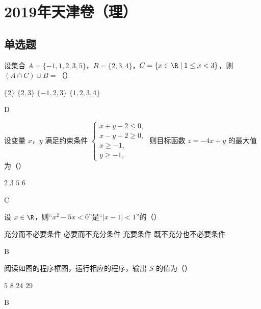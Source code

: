 \chapter{2019年天津卷（理）}

\section{单选题}

\begin{problem}
设集合 \( A=\{-1,1,2,3,5\} \)，\( B=\{2,3,4\} \)，\( C=\{x\in \R\mid 1\le x<3\} \)，则 \( (A\cap C)\cup B= \)（\quad）

\choices
    {\(\{2\}\)}
    {\(\{2,3\}\)}
    {\(\{-1,2,3\}\)}
    {\(\{1,2,3,4\}\)}
\begin{answer}
D
\end{answer}
\end{problem}



\begin{problem}
设变量 \(x\)，\(y\) 满足约束条件 \( \begin{cases}
x+y-2\le 0,\\
x-y+2\ge 0,\\
x\ge -1,\\
y\ge -1,
\end{cases} \)
则目标函数 \( z=-4x+y \) 的最大值为（\quad）

\choices
    {\(2\)}
    {\(3\)}
    {\(5\)}
    {\(6\)}
\begin{answer}
C
\end{answer}
\end{problem}



\begin{problem}
设 \( x\in \R \)，则“\( x^2-5x<0 \)”是“\( |x-1|<1 \)”的（\quad）

\choices
    {充分而不必要条件}
    {必要而不充分条件}
    {充要条件}
    {既不充分也不必要条件}
\begin{answer}
B
\end{answer}
\end{problem}



\begin{problem}
阅读如图的程序框图，运行相应的程序，输出 \(S\) 的值为（\quad）

\begingroup
{}
\endgroup

\choices
    {\(5\)}
    {\(8\)}
    {\(24\)}
    {\(29\)}
\begin{answer}
B
\end{answer}
\end{problem}



